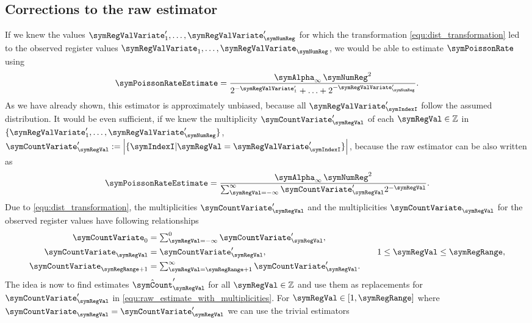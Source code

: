\documentclass[a4paper]{scrartcl}
\begin{document}
\subsection{Corrections to the raw estimator}
If we knew the values $\symRegValVariate'_1,\ldots,\symRegValVariate'_\symNumReg$ for which the transformation \eqref{equ:dist_transformation} led to the observed register values $\symRegValVariate_1,\ldots,\symRegValVariate_\symNumReg$, we would be able to estimate $\symPoissonRate$ using
\begin{equation}
\symPoissonRateEstimate 
= 
\frac{\symAlpha_\infty\,\symNumReg^2}{2^{-\symRegValVariate'_1}+\ldots+2^{-\symRegValVariate'_\symNumReg}}.
\end{equation}
As we have already shown, this estimator is approximately unbiased, because all $\symRegValVariate'_\symIndexI$ follow the assumed distribution. It would be even sufficient, if we knew the multiplicity $\symCountVariate'_\symRegVal$
of each $\symRegVal\in\mathbb{Z}$ in $\lbrace\symRegValVariate'_1,\ldots,\symRegValVariate'_\symNumReg\rbrace$, $\symCountVariate'_\symRegVal := \left|\lbrace \symIndexI\vert \symRegVal = \symRegValVariate'_\symIndexI\rbrace\right|$, because the raw estimator can be also written as
\begin{equation}
\label{equ:raw_estimate_with_multiplicities}
\symPoissonRateEstimate 
= 
\frac{\symAlpha_\infty\,\symNumReg^2}{\sum_{\symRegVal=-\infty}^\infty \symCountVariate'_\symRegVal 2^{-\symRegVal}}.
\end{equation}
Due to \eqref{equ:dist_transformation}, the multiplicities $\symCountVariate'_\symRegVal$ and the multiplicities $\symCountVariate_\symRegVal$ for the observed register values have following relationships
\begin{equation}
\label{equ:multiplicity_transformation}
\begin{aligned}
\symCountVariate_0 &= \textstyle\sum_{\symRegVal = -\infty}^{0} \symCountVariate'_\symRegVal,& \\
\symCountVariate_\symRegVal &=  \symCountVariate'_\symRegVal,& \quad 1\leq\symRegVal\leq\symRegRange,\\
\symCountVariate_{\symRegRange+1} &= \textstyle\sum_{\symRegVal = \symRegRange + 1}^{\infty} \symCountVariate'_\symRegVal.&
\end{aligned}
\end{equation}
The idea is now to find estimates $\hat{\symCount}'_\symRegVal$ for all $\symRegVal\in\mathbb{Z}$ and use them as replacements for $\symCountVariate'_\symRegVal$ in \eqref{equ:raw_estimate_with_multiplicities}. For $\symRegVal\in[1,\symRegRange]$ where $\symCountVariate_\symRegVal = \symCountVariate'_\symRegVal$ we can use the trivial estimators 
\end{document}
